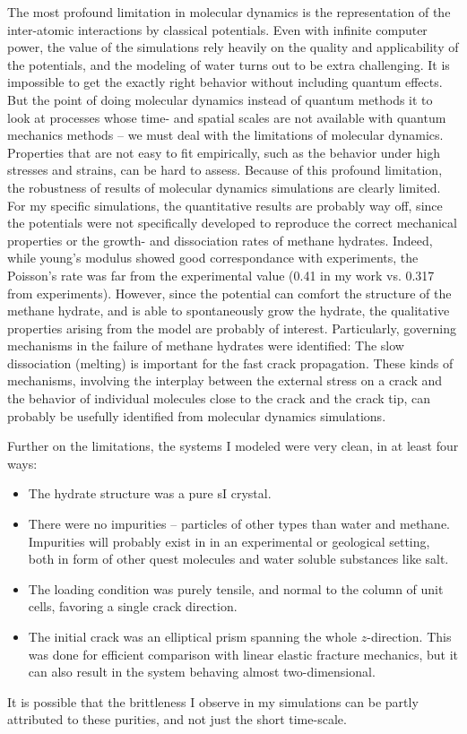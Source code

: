 The most profound limitation in molecular dynamics is the representation of the inter-atomic interactions by classical potentials. Even with infinite computer power, the value of the simulations rely heavily on the quality and applicability of the potentials, and the modeling of water turns out to be extra challenging. It is impossible to get the exactly right behavior without including quantum effects. But the point of doing molecular dynamics instead of quantum methods it to look at processes whose time- and spatial scales are not available with quantum mechanics methods -- we must deal with the limitations of molecular dynamics. Properties that are not easy to fit empirically, such as the behavior under high stresses and strains, can be hard to assess. Because of this profound limitation, the robustness of results of molecular dynamics simulations are clearly limited. For my specific simulations, the quantitative results are probably way off, since the potentials were not specifically developed to reproduce the correct mechanical properties or the growth- and dissociation rates of methane hydrates. Indeed, while young's modulus showed good correspondance with experiments, the Poisson's rate was far from the experimental value (0.41 in my work vs. 0.317 from experiments). However, since the potential can comfort the structure of the methane hydrate, and is able to spontaneously grow the hydrate, the qualitative properties arising from the model are probably of interest. Particularly, governing mechanisms in the failure of methane hydrates were identified: The slow dissociation (melting) is important for the fast crack propagation. These kinds of mechanisms,  involving the interplay between the external stress on a crack and the behavior of individual molecules close to the crack and the crack tip, can probably be usefully identified from molecular dynamics simulations.

Further on the limitations, the systems I modeled were very clean, in at least four ways: 
\begin{itemize}
\item The hydrate structure was a pure sI crystal. 
\item There were no impurities -- particles of other types than water and methane. Impurities will probably exist in in an experimental or geological setting, both in form of other quest molecules and water soluble substances like salt. 
\item The loading condition was purely tensile, and normal to the column of unit cells, favoring a single crack direction.
\item The initial crack was an elliptical prism spanning the whole $z$-direction. This was done for efficient comparison with linear elastic fracture mechanics, but it can also result in the system behaving almost two-dimensional. 
\end{itemize}
It is possible that the brittleness I observe in my simulations can be partly attributed to these purities, and not just the short time-scale.


